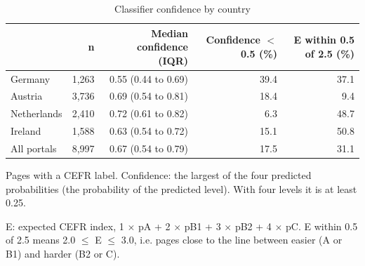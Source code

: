 \begin{table}[htbp]
\centering
\begin{threeparttable}
\caption{Classifier confidence by country}
\label{tab:confidence}
\begin{tabular}{lrrrr}
\hline
 & n & Median confidence (IQR) & Confidence $<$ 0.5 (\%) & E within 0.5 of 2.5 (\%) \\
\hline
Germany & 1,263 & 0.55 (0.44 to 0.69) & 39.4 & 37.1 \\
Austria & 3,736 & 0.69 (0.54 to 0.81) & 18.4 & 9.4 \\
Netherlands & 2,410 & 0.72 (0.61 to 0.82) & 6.3 & 48.7 \\
Ireland & 1,588 & 0.63 (0.54 to 0.72) & 15.1 & 50.8 \\
\hline
All portals & 8,997 & 0.67 (0.54 to 0.79) & 17.5 & 31.1 \\
\hline
\end{tabular}
\begin{tablenotes}
\footnotesize
\item Pages with a CEFR label. Confidence: the largest of the four predicted probabilities (the probability of the predicted level). With four levels it is at least 0.25.
\item E: expected CEFR index, 1 $\times$ pA + 2 $\times$ pB1 + 3 $\times$ pB2 + 4 $\times$ pC. E within 0.5 of 2.5 means 2.0 $\le$ E $\le$ 3.0, i.e. pages close to the line between easier (A or B1) and harder (B2 or C).
\end{tablenotes}
\end{threeparttable}
\end{table}
